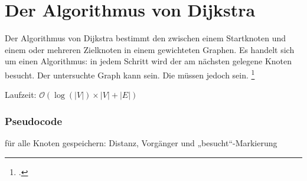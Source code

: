 \documentclass{lehramt-informatik-haupt}
\begin{document}

\chapter{Der Algorithmus von Dijkstra}

\noindent
Der Algorithmus von Dijkstra bestimmt den 
zwischen einem Startknoten und einem oder mehreren Zielknoten in einem
gewichteten Graphen.
%
Es handelt sich um einen  Algorithmus: in jedem Schritt
wird der am nächsten gelegene Knoten besucht. Der untersuchte Graph kann
 sein. Die 
müssen jedoch  sein.
\footcite[Seite 11]{aud:fs:6}

Laufzeit: $\mathcal{O}(\log(|V|) \times |V| + |E|)$

\subsection{Pseudocode}

für alle Knoten gespeichern: Distanz, Vorgänger und „besucht“-Markierung
\end{document}
